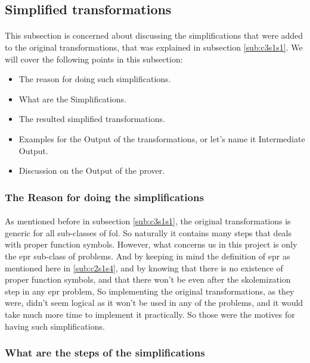 \subsection{Simplified transformations}\label{sub:c3s1s2}
	\paragraph{}
	This subsection is concerned about discussing the simplifications that were added to the original transformations, that was explained in subsection \ref{sub:c3s1s1}. We will cover the following points in this subsection:
	\begin{itemize}
		\item The reason for doing such simplifications.
		\item What are the Simplifications.
		\item The resulted simplified transformations.
		\item Examples for the Output of the transformations, or let's name it Intermediate Output.
		\item Discussion on the Output of the prover.
	\end{itemize}

	\subsubsection{The Reason for doing the simplifications}
		\paragraph{}
		As mentioned before in subsection \ref{sub:c3s1s1}, the original transformations is generic for all sub-classes of \ac{fol}. So naturally it contains many steps that deals with proper function symbols. However, what concerns us in this project is only the \ac{epr} sub-class of problems. And by keeping in mind the definition of \ac{epr} as mentioned here in \ref{sub:c2s1s4}, and by knowing that there is no existence of proper function symbols, and that there won't be even after the skolemization step in any \ac{epr} problem, So implementing the original transformations, as they were, didn't seem logical as it won't be used in any of the problems, and it would take much more time to implement it practically. So those were the motives for having such simplifications.
	
	\subsubsection{What are the steps of the simplifications}
